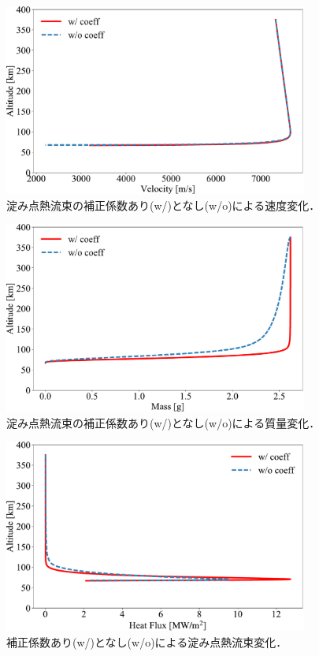 \begin{figure}[H]
    \centering
    \includegraphics[width=10cm]{fig/couple/heat-coeff/velo.pdf}
    \caption{淀み点熱流束の補正係数あり(w/)となし(w/o)による速度変化．}
    \label{fig:couble-heat-velo}
\end{figure}
\begin{figure}[H]
    \centering
    \includegraphics[width=10cm]{fig/couple/heat-coeff/mass.pdf}
    \caption{淀み点熱流束の補正係数あり(w/)となし(w/o)による質量変化．}
    \label{fig:couble-heat-mass}
\end{figure}
\begin{figure}[H]
    \centering
    \includegraphics[width=10cm]{fig/couple/heat-coeff/heat.pdf}
    \caption{補正係数あり(w/)となし(w/o)による淀み点熱流束変化．}
    \label{fig:couble-heat-heat}
\end{figure}
